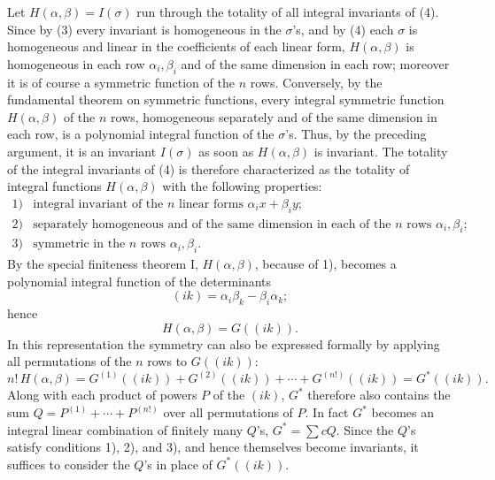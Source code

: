 \documentclass[11pt]{article}
\begin{document}
Let \(H(\alpha,\beta)=I(\sigma)\) run through the totality of all integral invariants of (4). Since by (3) every invariant is homogeneous in the \(\sigma\)'s, and by (4) each \(\sigma\) is homogeneous and linear in the coefficients of each linear form, \(H(\alpha,\beta)\) is homogeneous in each row \(\alpha_i,\beta_i\) and of the same dimension in each row; moreover it is of course a symmetric function of the \(n\) rows. Conversely, by the fundamental theorem on symmetric functions, every integral symmetric function \(H(\alpha,\beta)\) of the \(n\) rows, homogeneous separately and of the same dimension in each row, is a polynomial integral function of the \(\sigma\)'s. Thus, by the preceding argument, it is an invariant \(I(\sigma)\) as soon as \(H(\alpha,\beta)\) is invariant. The totality of the integral invariants of (4) is therefore characterized as the totality of integral functions \(H(\alpha,\beta)\) with the following properties:
\[
\begin{array}{ll}
1) & \text{integral invariant of the \(n\) linear forms \(\alpha_i x+\beta_i y\);}\\
2) & \text{separately homogeneous and of the same dimension in each of the \(n\) rows \(\alpha_i,\beta_i\);}\\
3) & \text{symmetric in the \(n\) rows \(\alpha_i,\beta_i\).}
\end{array}
\]
By the special finiteness theorem I, \(H(\alpha,\beta)\), because of 1), becomes a polynomial integral function of the determinants
\[
        (ik)=\alpha_i\beta_k-\beta_i\alpha_k;
\]
hence
\[
        H(\alpha,\beta)=G((ik)).
\]
In this representation the symmetry can also be expressed formally by applying all permutations of the \(n\) rows to \(G((ik))\):
\begin{equation}
        n!\,H(\alpha,\beta)
        =
        G^{(1)}((ik))+G^{(2)}((ik))+\cdots+G^{(n!)}((ik))
        =G^*((ik)).
\end{equation}
Along with each product of powers \(P\) of the \((ik)\), \(G^*\) therefore also contains the sum \(Q=P^{(1)}+\cdots+P^{(n!)}\) over all permutations of \(P\). In fact \(G^*\) becomes an integral linear combination of finitely many \(Q\)'s, \(G^*=\sum cQ\). Since the \(Q\)'s satisfy conditions 1), 2), and 3), and hence themselves become invariants, it suffices to consider the \(Q\)'s in place of \(G^*((ik))\).
\end{document}
